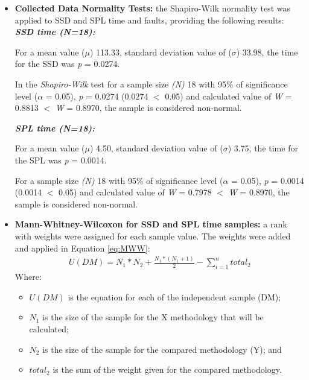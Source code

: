 \begin{itemize}

\item \textbf{Collected Data Normality Tests:} the Shapiro-Wilk \cite{shaphirowilk65} normality test was applied to SSD and SPL time and faults, providing the following results:\\

\textbf{\textit{SSD time (\textit{N}=18):}}

For a mean value ($\mu$) 113.33, standard deviation value of ($\sigma$) 33.98, the time for the SSD was \textit{p} = 0.0274.

In the \textit{Shapiro-Wilk} test for a sample size \textit{(N)} 18 with 95\% of significance level ($\alpha$ = 0.05), \textit{p} = 0.0274 (0.0274 $<$ 0.05) and calculated value of \textit{W} = 0.8813 $<$ \textit{W} = 0.8970, the sample is considered non-normal.

\textbf{\textit{SPL time (\textit{N}=18):}}

For a mean value ($\mu$) 4.50, standard deviation value of ($\sigma$) 3.75, the time for the SPL was \textit{p} = 0.0014.

For a sample size \textit{(N)} 18 with 95\% of significance level ($\alpha$ = 0.05), \textit{p} = 0.0014 (0.0014 $<$ 0.05) and calculated value of \textit{W} = 0.7978 $<$ \textit{W} = 0.8970, the sample is considered non-normal.

\item \textbf{Mann-Whitney-Wilcoxon for SSD and SPL time samples:} a rank with weights were assigned for each sample value. The weights were added and applied in Equation \ref{eq:MWW}:
\small
\begin{equation}
\begin{split}
\label{eq:MWW}
U(DM) = N_1 * N_2 + \frac{N_1*(N_1+1)}{2} - \sum_{i=1}^{n} total_{2}
\end{split}
\end{equation}
\normalsize 
Where:
\begin{itemize}
\item \textit{$U(DM)$} is the equation for each of the independent sample (DM);
\item \textit{$N_1$} is the size of the sample for the X methodology that will be calculated;
\item \textit{$N_2$} is the size of the sample for the compared methodology (Y); and
\item \textit{$total_{2}$} is the sum of the weight given for the compared methodology.
\end{itemize}


\end{itemize}
